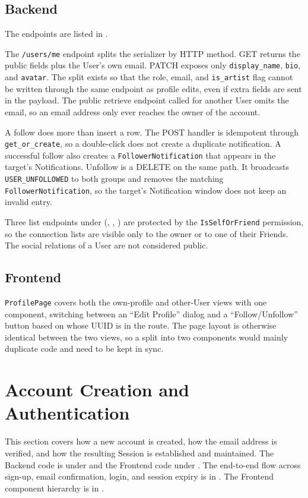 \subsection{Backend}
The endpoints are listed in
.

The \texttt{/users/me} endpoint splits the serializer by HTTP method.
GET returns the public fields plus the User's own email. PATCH
exposes only \texttt{display\_name}, \texttt{bio}, and \texttt{avatar}.
The split exists so that the role, email, and \texttt{is\_artist} flag
cannot be written through the same endpoint as profile edits, even if
extra fields are sent in the payload. The public retrieve endpoint
called for another User omits the email, so an email address only ever
reaches the owner of the account.

A follow does more than insert a row. The POST handler is idempotent
through \texttt{get\_or\_create}, so a double-click does not create a
duplicate notification. A successful follow also creates a
\texttt{FollowerNotification} that appears in the target's
Notifications. Unfollow is a DELETE on the same path. It broadcasts
\texttt{USER\_UNFOLLOWED} to both groups and removes the matching
\texttt{FollowerNotification}, so the target's Notification window
does not keep an invalid entry.

Three list endpoints under  (,
, ) are protected by the
\texttt{IsSelfOrFriend} permission, so the connection lists are
visible only to the owner or to one of their Friends. The social
relations of a User are not considered public.

\subsection{Frontend}
\texttt{ProfilePage} covers both the own-profile and other-User views
with one component, switching between an ``Edit Profile'' dialog and a
``Follow/Unfollow'' button based on whose UUID is in the route. The
page layout is otherwise identical between the two views, so a split
into two components would mainly duplicate code and need to be kept in sync.


\section{Account Creation and Authentication}
This section covers how a new account is created, how the email
address is verified, and how the resulting Session is established and
maintained. The Backend code is under
 and the Frontend code under
. The end-to-end flow
across sign-up, email confirmation, login, and session expiry is in
. The Frontend component hierarchy
is in .

